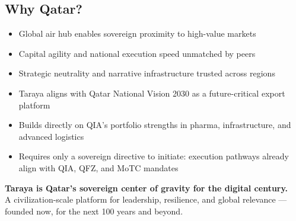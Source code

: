 \documentclass[12pt]{article}
\begin{document}
\begin{spacing}{1.1}
        \section*{Why Qatar?}
        \begin{itemize}
            \item Global air hub enables sovereign proximity to high-value markets
            \item Capital agility and national execution speed unmatched by peers
            \item Strategic neutrality and narrative infrastructure trusted across regions
            \item Taraya aligns with Qatar National Vision 2030 as a future-critical export platform
            \item Builds directly on QIA's portfolio strengths in pharma, infrastructure, and advanced logistics
            \item Requires only a sovereign directive to initiate: execution pathways already align with QIA, QFZ, and MoTC mandates
        \end{itemize}

        \noindent
        \textbf{Taraya is Qatar’s sovereign center of gravity for the digital century.} \\
        A civilization-scale platform for leadership, resilience, and global relevance — founded now, for the next 100 years and beyond.

    \end{spacing}
\end{document}
